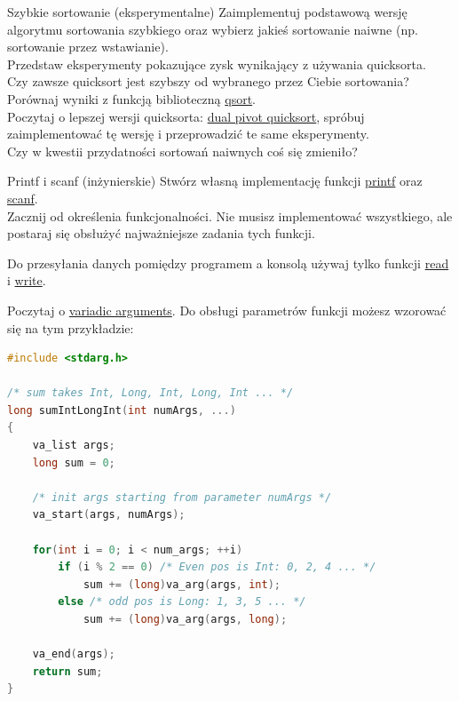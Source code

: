 \begin{exercise}{Szybkie sortowanie (eksperymentalne)}{}
Zaimplementuj podstawową wersję algorytmu sortowania szybkiego oraz wybierz jakieś sortowanie naiwne (np. sortowanie przez wstawianie). \\
Przedstaw eksperymenty pokazujące zysk wynikający z używania quicksorta. \\
Czy zawsze quicksort jest szybszy od wybranego przez Ciebie sortowania? \\
Porównaj wyniki z funkcją biblioteczną \href{https://linux.die.net/man/3/qsort}{qsort}. \\

Poczytaj o lepszej wersji quicksorta: \href{http://www.kriche.com.ar/root/programming/spaceTimeComplexity/DualPivotQuicksort.pdf}{dual pivot quicksort}, spróbuj zaimplementować tę wersję i przeprowadzić te same eksperymenty. \\
Czy w kwestii przydatności sortowań naiwnych coś się zmieniło?
\end{exercise}



\begin{exercise}{Printf i scanf (inżynierskie)}{}
Stwórz własną implementację funkcji \href{https://linux.die.net/man/3/printf}{printf} oraz \href{https://linux.die.net/man/3/scanf}{scanf}. \\
Zacznij od określenia funkcjonalności. Nie musisz implementować wszystkiego, ale postaraj się obsłużyć najważniejsze zadania tych funkcji.

Do przesyłania danych pomiędzy programem a konsolą używaj tylko funkcji \href{http://man7.org/linux/man-pages/man2/read.2.html}{read} i \href{https://linux.die.net/man/2/write}{write}.

Poczytaj o \href{https://en.wikipedia.org/wiki/Stdarg.h}{variadic arguments}. Do obsługi parametrów funkcji możesz wzorować się na tym przykładzie:
\begin{lstlisting}[language=C,style=C99]
#include <stdarg.h>

/* sum takes Int, Long, Int, Long, Int ... */
long sumIntLongInt(int numArgs, ...)
{
    va_list args;
    long sum = 0;
    
    /* init args starting from parameter numArgs */
    va_start(args, numArgs);
    
    for(int i = 0; i < num_args; ++i)
        if (i % 2 == 0) /* Even pos is Int: 0, 2, 4 ... */
            sum += (long)va_arg(args, int);
        else /* odd pos is Long: 1, 3, 5 ... */
            sum += (long)va_arg(args, long);
            
    va_end(args);
    return sum;
}
\end{lstlisting}
\end{exercise}

